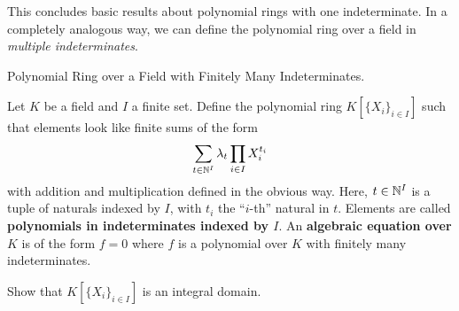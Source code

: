 \documentclass[../../book.tex]{subfiles}
\begin{document}
This concludes basic results about polynomial rings with one indeterminate.
In a completely analogous way, 
we can define the polynomial ring over a field in \emph{multiple indeterminates}. 

\begin{ex} Polynomial Ring over a Field with Finitely Many Indeterminates.
    
    Let $K$ be a field and $I$ a finite set. 
    Define the polynomial ring $K[\{X_i\}_{i \in I}]$
    such that elements look like finite sums of the form \[
        \sum_{t \in \mathbb{N}^I} 
        \lambda_t \prod_{i\in I} X_i^{t_i}
    \]
    with addition and multiplication defined in the obvious way. 
    Here, $t \in \mathbb{N}^I$ is a tuple of naturals indexed by $I$,
    with $t_i$ the ``$i$-th'' natural in $t$.
    Elements are called \textbf{polynomials in indeterminates indexed by $I$}.
    An \textbf{algebraic equation over $K$} is of the form $f = 0$ 
    where $f$ is a polynomial over $K$ with finitely many indeterminates. 

    Show that $K[\{X_i\}_{i \in I}]$ is an integral domain. 
\end{ex}

\end{document}
